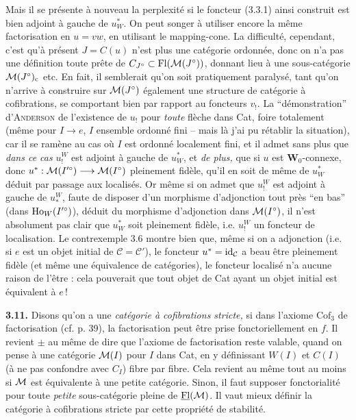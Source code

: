 Mais il se présente à nouveau la perplexité si le foncteur (3.3.1) ainsi construit est bien adjoint à gauche de $u_W^*$. On peut songer à utiliser encore la même factorisation en $u = vw$, en
utilisant le mapping-cone. La difficulté, cependant, c'est qu'à présent $J = C(u)$ n'est plus une catégorie ordonnée, donc on n'a pas une définition toute prête de $C_{J^\circ}\subset\operatorname{Fl}(\mathcal{M}(J^\circ))$, donnant lieu à une sous-catégorie $\mathcal{M}(J^\circ)_{\mathrm{c}}$ etc. En fait, il semblerait qu'on soit pratiquement paralysé, tant qu'on n'arrive à construire sur $\mathcal{M}(J^\circ)$ également une structure de catégorie à cofibrations, se comportant bien par rapport au foncteurs $v_!$. La %
“démonstration” d'\textsc{Anderson} de l'existence de $u_!$ pour \textit{toute} flèche dans Cat, foire totalement (même pour $I\longrightarrow e$, $I$ ensemble ordonné fini – mais là j'ai pu rétablir la situation), car il se ramène au cas où $I$ est ordonné localement fini, et il
admet sans plus que \textit{dans ce cas} $u_!^W$ est adjoint à gauche de $u_W^*$, et \textit{de plus,} que si $u$ est $\mathbf{W}_0$-connexe, donc $u^* : \mathcal{M}(I'^\circ)\longrightarrow\mathcal{M}(I^\circ)$ pleinement fidèle, qu'il en soit de même de $u_W^*$ déduit par passage aux localisés. Or même si on admet que $u_!^W$ est adjoint à gauche de
$u_*^W$, faute de disposer d'un morphisme d'adjonction tout près “en bas” (dans $\operatorname{Ho}_W(I'^\circ)$), %
déduit du morphisme d'adjonction dans $\mathcal{M}(I^\circ)$, il n'est absolument pas clair que $u_W^*$ soit pleinement fidèle, i.e. $u_!^W$ un foncteur de localisation. Le contrexemple 3.6 montre bien que, même si on a adjonction (i.e. si $e$ est un objet initial de $\mathcal{C} = \mathcal{C}'$), le foncteur $u^* = \mathrm{id}_{\mathcal{C}}$ a beau être pleinement fidèle (et même une équivalence de catégories), le foncteur localisé n'a aucune raison de l'être : cela pouverait que tout objet de Cat ayant un objet initial %
est équivalent à $e$\,!

\textbf{3.11.} Disons qu'on a une \textit{catégorie à cofibrations stricte,} si dans l'axiome $\mathrm{Cof}_3$ de factorisation (cf. p. 39), la factorisation peut être prise fonctoriellement en $f$. Il revient $\pm$ au même de dire que l'axiome de factorisation reste valable, quand on pense à une catégorie $\mathcal{M}(I)$ pour $I$ dans Cat, en y définissant $W(I)$ et $C(I)$ (à ne pas confondre avec $C_I$) fibre par fibre. Cela revient au même tout au moins si $\mathcal{M}$ est équivalente à une petite catégorie. Sinon, il faut supposer fonctorialité pour toute \textit{petite} sous-catégorie pleine de $\underline{\mathrm{Fl}}(\mathcal{M})$. Il vaut mieux définir la catégorie à cofibrations stricte par cette propriété de stabilité.

